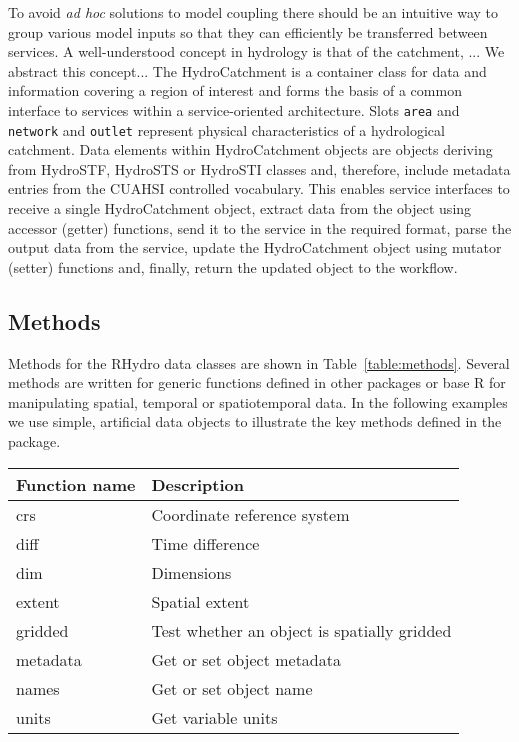 \documentclass{icldt}\usepackage[]{graphicx}\usepackage[]{color}
\begin{document}
To avoid \textit{ad hoc} solutions to model coupling there should be an intuitive way to group various model inputs so that they can efficiently be transferred between services. A well-understood concept in hydrology is that of the catchment, ... We abstract this concept... The HydroCatchment is a container class for data and information covering a region of interest and forms the basis of a common interface to services within a service-oriented architecture. Slots \texttt{area} and \texttt{network} and \texttt{outlet} represent physical characteristics of a hydrological catchment. Data elements within HydroCatchment objects are objects deriving from HydroSTF, HydroSTS or HydroSTI classes and, therefore, include metadata entries from the CUAHSI controlled vocabulary. This enables service interfaces to receive a single HydroCatchment object, extract data from the object using accessor (getter) functions, send it to the service in the required format, parse the output data from the service, update the HydroCatchment object using mutator (setter) functions and, finally, return the updated object to the workflow. \\

\subsection{Methods} %
Methods for the RHydro data classes are shown in Table~\ref{table:methods}. Several methods are written for generic functions defined in other packages or base R for manipulating spatial, temporal or spatiotemporal data. In the following examples we use simple, artificial data objects to illustrate the key methods defined in the package. \\

\begin{table*}[t]
\caption{Methods included in the \textbf{RHydro} package}
\begin{tabular}{ p{3.5cm} p{8.5cm} }
\toprule
Function name & Description \\
\midrule
crs           & Coordinate reference system \\
diff          & Time difference \\
dim           & Dimensions \\
extent        & Spatial extent \\
gridded       & Test whether an object is spatially gridded \\
metadata      & Get or set object metadata \\
names         & Get or set object name \\
units         & Get variable units \\
\bottomrule
\end{tabular}
\label{table:methods}
\end{table*}
\end{document}
